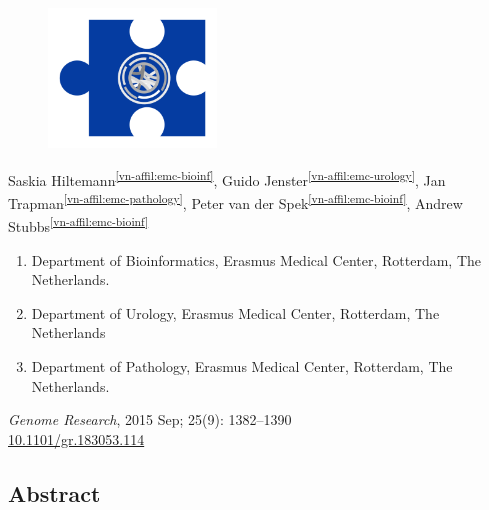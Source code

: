 \cleartorightpage
\setcounter{NAT@ctr}{-1}
\chapter*{}\label{chapter:vnmethod}

\begin{figure}[t!]
\centering
\includegraphics[height=10em]{frontmatter/images/chapter-header-variants.png}
\end{figure}
\vspace{-4cm}

\label{chapter:vnmethod-paper}

Saskia Hiltemann\textsuperscript{\ref{vn-affil:emc-bioinf}},
Guido Jenster\textsuperscript{\ref{vn-affil:emc-urology}},
Jan Trapman\textsuperscript{\ref{vn-affil:emc-pathology}},
Peter van der Spek\textsuperscript{\ref{vn-affil:emc-bioinf}},
Andrew Stubbs\textsuperscript{\ref{vn-affil:emc-bioinf}}

\small
\begin{enumerate}
\itemsep-0.5em
\item Department of Bioinformatics, Erasmus Medical Center, Rotterdam, The Netherlands. \label{vn-affil:emc-bioinf}
\item Department of Urology, Erasmus Medical Center, Rotterdam, The Netherlands \label{vn-affil:emc-urology}
\item Department of Pathology, Erasmus Medical Center, Rotterdam, The Netherlands. \label{vn-affil:emc-pathology}
\end{enumerate}

{\color{chaptergrey}{Published in:}} \emph{Genome Research}, 2015 Sep; 25(9): 1382–1390 \\
{\color{chaptergrey}{DOI:}} \hyperref[https://doi.org/10.1101/gr.183053.114]{10.1101/gr.183053.114}

\normalsize

\section*{Abstract}

